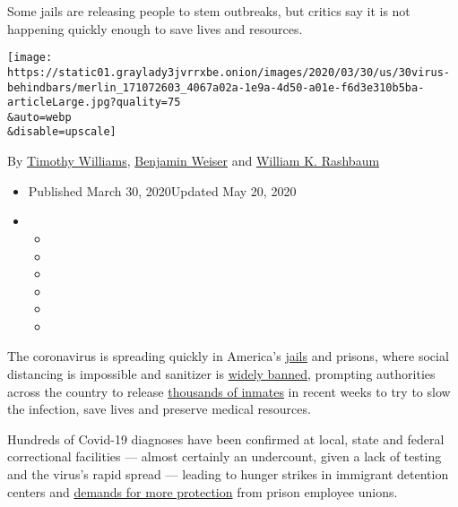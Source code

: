 Some jails are releasing people to stem outbreaks, but critics say it is
not happening quickly enough to save lives and resources.

\texttt{[image: https://static01.graylady3jvrrxbe.onion/images/2020/03/30/us/30virus-behindbars/merlin\_171072603\_4067a02a-1e9a-4d50-a01e-f6d3e310b5ba-articleLarge.jpg?quality=75\\\&auto=webp\\\&disable=upscale]}

By \href{https://www.nytimes3xbfgragh.onion/by/timothy-williams}{Timothy
Williams},
\href{https://www.nytimes3xbfgragh.onion/by/benjamin-weiser}{Benjamin
Weiser} and
\href{https://www.nytimes3xbfgragh.onion/by/william-k-rashbaum}{William
K. Rashbaum}

\begin{itemize}
\item
  Published March 30, 2020Updated May 20, 2020
\item
  \begin{itemize}
  \item
  \item
  \item
  \item
  \item
  \item
  \end{itemize}
\end{itemize}

The coronavirus is spreading quickly in America's
\href{https://www.nytimes3xbfgragh.onion/2020/05/20/nyregion/rikers-coronavirus-nyc.html}{jails}
and prisons, where social distancing is impossible and sanitizer is
\href{https://www.themarshallproject.org/2020/03/06/when-purell-is-contraband-how-do-you-contain-coronavirus}{widely
banned}, prompting authorities across the country to release
\href{https://www.nytimes3xbfgragh.onion/2020/03/23/nyregion/coronavirus-nj-inmates-release.html}{thousands
of inmates} in recent weeks to try to slow the infection, save lives and
preserve medical resources.

Hundreds of Covid-19 diagnoses have been confirmed at local, state and
federal correctional facilities --- almost certainly an undercount,
given a lack of testing and the virus's rapid spread --- leading to
hunger strikes in immigrant detention centers and
\href{https://www.nytimes3xbfgragh.onion/2020/03/17/us/coronavirus-prisons-jails.html}{demands
for more protection} from prison employee unions.

